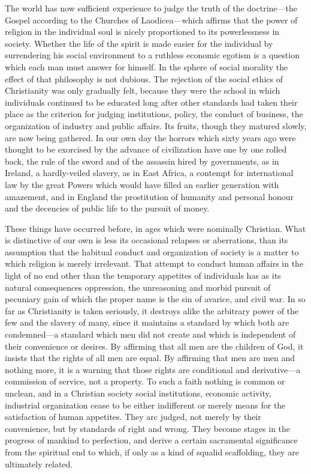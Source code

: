 \documentclass{book}
\begin{document}
The world has now sufficient experience to judge the truth of the doctrine—the Gospel according to the Churches of Laodicea—which affirms that the power of religion in the individual soul is nicely proportioned to its powerlessness in society. Whether the life of the spirit is made easier for the individual by surrendering his social environment to a ruthless economic egotism is a question which each man must answer for himself. In the sphere of social morality the effect of that philosophy is not dubious. The rejection of the social ethics of Christianity was only gradually felt, because they were the school in which individuals continued to be educated long after other standards had taken their place as the criterion for judging institutions, policy, the conduct of business, the organization of industry and public affairs. Its fruits, though they matured slowly, are now being gathered. In our own day the horrors which sixty years ago were thought to be exorcised by the advance of civilization have one by one rolled back, the rule of the sword and of the assassin hired by governments, as in Ireland, a hardly-veiled slavery, as in East Africa, a contempt for international law by the great Powers which would have filled an earlier generation with amazement, and in England the prostitution of humanity and personal honour and the decencies of public life to the pursuit of money.

These things have occurred before, in ages which were nominally Christian. What is distinctive of our own is less its occasional relapses or aberrations, than its assumption that the habitual conduct and organization of society is a matter to which religion is merely irrelevant. That attempt to conduct human affairs in the light of no end other than the temporary appetites of individuals has as its natural consequences oppression, the unreasoning and morbid pursuit of pecuniary gain of which the proper name is the sin of avarice, and civil war. In so far as Christianity is taken seriously, it destroys alike the arbitrary power of the few and the slavery of many, since it maintains a standard by which both are condemned—a standard which men did not create and which is independent of their convenience or desires. By affirming that all men are the children of God, it insists that the rights of all men are equal. By affirming that men are men and nothing more, it is a warning that those rights are conditional and derivative—a commission of service, not a property. To such a faith nothing is common or unclean, and in a Christian society social institutions, economic activity, industrial organization cease to be either indifferent or merely means for the satisfaction of human appetites. They arc judged, not merely by their convenience, but by standards of right and wrong. They become stages in the progress of mankind to perfection, and derive a certain sacramental significance from the spiritual end to which, if only as a kind of squalid scaffolding, they are ultimately related.
\end{document}
